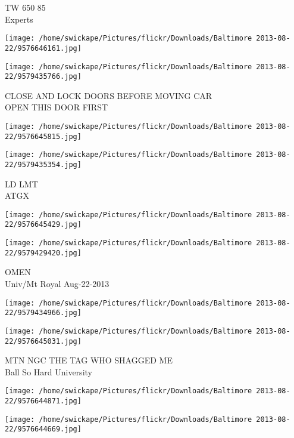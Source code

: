 \documentclass[10pt,letterpaper]{article}
\begin{document}
TW 650 85\\
Experts\\
\pagebreak

\texttt{[image: /home/swickape/Pictures/flickr/Downloads/Baltimore 2013-08-22/9576646161.jpg]}

\vspace{0.25in}
\texttt{[image: /home/swickape/Pictures/flickr/Downloads/Baltimore 2013-08-22/9579435766.jpg]}

CLOSE AND LOCK DOORS BEFORE MOVING CAR\\
OPEN THIS DOOR FIRST\\
\pagebreak

\texttt{[image: /home/swickape/Pictures/flickr/Downloads/Baltimore 2013-08-22/9576645815.jpg]}

\vspace{0.25in}
\texttt{[image: /home/swickape/Pictures/flickr/Downloads/Baltimore 2013-08-22/9579435354.jpg]}

LD LMT\\
ATGX\\
\pagebreak

\texttt{[image: /home/swickape/Pictures/flickr/Downloads/Baltimore 2013-08-22/9576645429.jpg]}

\vspace{0.25in}
\texttt{[image: /home/swickape/Pictures/flickr/Downloads/Baltimore 2013-08-22/9579429420.jpg]}

OMEN\\
Univ/Mt Royal Aug{-}22{-}2013\\
\pagebreak

\texttt{[image: /home/swickape/Pictures/flickr/Downloads/Baltimore 2013-08-22/9579434966.jpg]}

\vspace{0.25in}
\texttt{[image: /home/swickape/Pictures/flickr/Downloads/Baltimore 2013-08-22/9576645031.jpg]}

MTN NGC THE TAG WHO SHAGGED ME\\
Ball So Hard University\\
\pagebreak

\texttt{[image: /home/swickape/Pictures/flickr/Downloads/Baltimore 2013-08-22/9576644871.jpg]}

\vspace{0.25in}
\texttt{[image: /home/swickape/Pictures/flickr/Downloads/Baltimore 2013-08-22/9576644669.jpg]}
\end{document}
